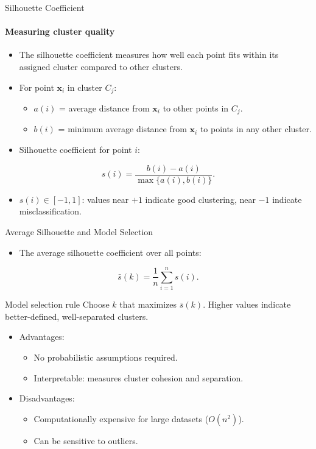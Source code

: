 \begin{frame}{Silhouette Coefficient}
  \framesubtitle{Measuring cluster quality}
  \begin{itemize}
    \item The \alert{silhouette coefficient} measures how well each point fits within its
          assigned cluster compared to other clusters.
    \item For point $\mathbf{x}_i$ in cluster $C_j$:
      \begin{itemize}
        \item $a(i)$ = average distance from $\mathbf{x}_i$ to other points in $C_j$.
        \item $b(i)$ = minimum average distance from $\mathbf{x}_i$ to points in any other
              cluster.
      \end{itemize}
    \item Silhouette coefficient for point $i$:
  \end{itemize}
  \[
  s(i) = \frac{b(i) - a(i)}{\max\{a(i), b(i)\}}.
  \]
  \begin{itemize}
    \item $s(i) \in [-1, 1]$: values near $+1$ indicate good clustering, near $-1$
          indicate misclassification.
  \end{itemize}
\end{frame}

\begin{frame}{Average Silhouette and Model Selection}
  \begin{itemize}
    \item The \alert{average silhouette coefficient} over all points:
  \end{itemize}
  \[
  \bar{s}(k) = \frac{1}{n}\sum_{i=1}^{n} s(i).
  \]
  \begin{block}{Model selection rule}
    Choose $k$ that \alert{maximizes} $\bar{s}(k)$. Higher values indicate better-defined,
    well-separated clusters.
  \end{block}
  \begin{itemize}
    \item Advantages:
      \begin{itemize}
        \item No probabilistic assumptions required.
        \item Interpretable: measures cluster cohesion and separation.
      \end{itemize}
    \item Disadvantages:
      \begin{itemize}
        \item Computationally expensive for large datasets ($O(n^2)$).
        \item Can be sensitive to outliers.
      \end{itemize}
  \end{itemize}
\end{frame}

